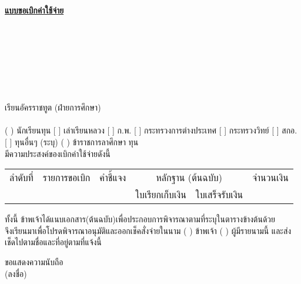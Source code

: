 \documentclass[a4paper,14pt]{article}
\begin{document}
\begin{center}
\textbf{\underline{แบบขอเบิกค่าใช้จ่าย}} \\
\end{center}

\begin{flushright}
 \\
 \\
 \\
 \\
 \\
\end{flushright}

\begin{flushleft}
 \\
เรียน\hspace{10pt}อัครราชทูต (ฝ่ายการศึกษา) \\
\ForceIndent{}  \\
( ) นักเรียนทุน [ ] เล่าเรียนหลวง [ ] ก.พ. [ ] กระทรวงการต่างประเทศ [ ] กระทรวงวิทย์ [ ] สกอ. [ ] ทุนอื่นๆ (ระบุ) ( ) ข้าราชการลาศึกษา ทุน \\

มีความประสงค์ของเบิกค่าใช้จ่ายดังนี้ \\
\ForceIndent\begin{tabular}{|l|l|l|l|l|l|}
\hline
ลำดับที่ & รายการขอเบิก & คำชี้แจง & \multicolumn{2}{|c|}{หลักฐาน (ต้นฉบับ)} & จำนวนเงิน \\ \cline{4-5}
& & & ใบเรียกเก็บเงิน & ใบเสร็จรับเงิน & \\
\hline
\end{tabular}

ทั้งนี้ ข้าพเจ้าได้แนบเอกสาร(ต้นฉบับ)เพื่อประกอบการพิจารณาตามที่ระบุในตารางข้างต้นด้วย \\
จึงเรียนมาเพื่อโปรดพิจารณาอนุมัติและออกเช็คสั่งจ่ายในนาม ( ) ข้าพเจ้า ( ) ผู้มีรายนามนี้ และส่งเช็ดไปตามชื่อและที่อยู่ตามที่แจ้งนี้ \\
\end{flushleft}

ขอแสดงความนับถือ \\
(ลงชื่อ) \\
\end{document}
